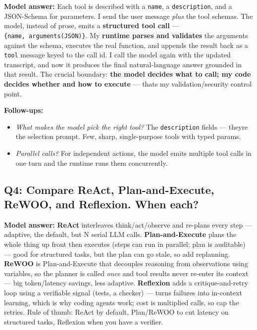 \documentclass[11pt]{article}
\providecommand{\tightlist}{\setlength{\itemsep}{1pt}\setlength{\parskip}{0pt}}
\begin{document}
\textbf{Model answer:} Each tool is described with a \texttt{name}, a \texttt{description}, and a JSON-Schema for parameters. I send the user message \emph{plus} the tool schemas. The model, instead of prose, emits a \textbf{structured tool call} --- \texttt{\{name,\ arguments(JSON)\}}. My \textbf{runtime parses and validates} the arguments against the schema, executes the real function, and appends the result back as a \texttt{tool} message keyed to the call id. I call the model again with the updated transcript, and now it produces the final natural-language answer grounded in that result. The crucial boundary: \textbf{the model decides what to call; my code decides whether and how to execute} --- that\textquotesingle s my validation/security control point.

\textbf{Follow-ups:}

\begin{itemize}
\tightlist
\item
  \emph{What makes the model pick the right tool?} The \texttt{description} fields --- they\textquotesingle re the selection prompt. Few, sharp, single-purpose tools with typed params.
\item
  \emph{Parallel calls?} For independent actions, the model emits multiple tool calls in one turn and the runtime runs them concurrently.
\end{itemize}

\subsection{Q4: Compare ReAct, Plan-and-Execute, ReWOO, and Reflexion. When each?}\label{q4-compare-react-plan-and-execute-rewoo-and-reflexion-when-each}

\textbf{Model answer:} \textbf{ReAct} interleaves think/act/observe and re-plans every step --- adaptive, the default, but N serial LLM calls. \textbf{Plan-and-Execute} plans the whole thing up front then executes (steps can run in parallel; plan is auditable) --- good for structured tasks, but the plan can go stale, so add replanning. \textbf{ReWOO} is Plan-and-Execute that decouples reasoning from observations using variables, so the planner is called \emph{once} and tool results never re-enter its context --- big token/latency savings, less adaptive. \textbf{Reflexion} adds a critique-and-retry loop using a verifiable signal (tests, a checker) --- turns failures into in-context learning, which is why coding agents work; cost is multiplied calls, so cap the retries. Rule of thumb: ReAct by default, Plan/ReWOO to cut latency on structured tasks, Reflexion when you have a verifier.
\end{document}

